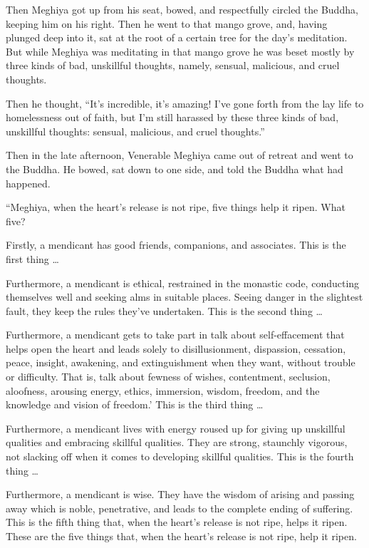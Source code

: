 \documentclass[12pt,openany]{book}%
\begin{document}
Then Meghiya got up from his seat, bowed, and respectfully circled the Buddha, keeping him on his right. Then he went to that mango grove, and, having plunged deep into it, sat at the root of a certain tree for the day’s meditation. But while Meghiya was meditating in that mango grove he was beset mostly by three kinds of bad, unskillful thoughts, namely, sensual, malicious, and cruel thoughts. 

Then he thought, “It’s incredible, it’s amazing! I’ve gone forth from the lay life to homelessness out of faith, but I’m still harassed by these three kinds of bad, unskillful thoughts: sensual, malicious, and cruel thoughts.” 

Then in the late afternoon, Venerable Meghiya came out of retreat and went to the Buddha. He bowed, sat down to one side, and told the Buddha what had happened. 

“Meghiya, when the heart’s release is not ripe, five things help it ripen. What five? 

Firstly, a mendicant has good friends, companions, and associates. This is the first thing … 

Furthermore, a mendicant is ethical, restrained in the monastic code, conducting themselves well and seeking alms in suitable places. Seeing danger in the slightest fault, they keep the rules they’ve undertaken. This is the second thing … 

Furthermore, a mendicant gets to take part in talk about self-effacement that helps open the heart and leads solely to disillusionment, dispassion, cessation, peace, insight, awakening, and extinguishment when they want, without trouble or difficulty. That is, talk about fewness of wishes, contentment, seclusion, aloofness, arousing energy, ethics, immersion, wisdom, freedom, and the knowledge and vision of freedom.’ This is the third thing … 

Furthermore, a mendicant lives with energy roused up for giving up unskillful qualities and embracing skillful qualities. They are strong, staunchly vigorous, not slacking off when it comes to developing skillful qualities. This is the fourth thing … 

Furthermore, a mendicant is wise. They have the wisdom of arising and passing away which is noble, penetrative, and leads to the complete ending of suffering. This is the fifth thing that, when the heart’s release is not ripe, helps it ripen. These are the five things that, when the heart’s release is not ripe, help it ripen. 
\end{document}
